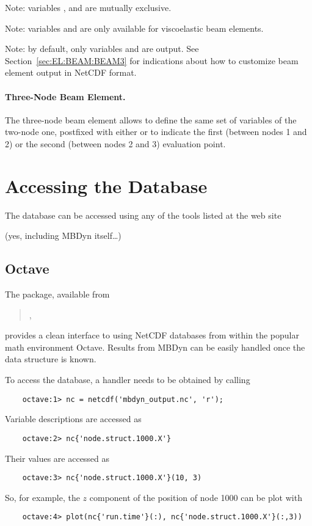 Note: variables ,  
and  are mutually exclusive.

Note: variables  and 
are only available for viscoelastic beam elements.

Note: by default, only variables 
and  are output.
See Section~\ref{sec:EL:BEAM:BEAM3} for indications
about how to customize beam element output in NetCDF format.

\paragraph{Three-Node Beam Element.}
The three-node beam element allows to define the same set of variables
of the two-node one, postfixed with either  or 
to indicate the first (between nodes 1 and 2)
or the second (between nodes 2 and 3)
evaluation point.






\section{Accessing the Database}
The database can be accessed using any of the tools listed at the web site
\begin{quote}
\end{quote}
(yes, including MBDyn itself\ldots)



\subsection{Octave}
The  package, available from
\begin{quote}
,
\end{quote}
provides a clean interface to using NetCDF databases from within
the popular math environment Octave.
Results from MBDyn can be easily handled once the data structure is known.

To access the database, a handler needs to be obtained by calling
\begin{verbatim}
    octave:1> nc = netcdf('mbdyn_output.nc', 'r');
\end{verbatim}
Variable descriptions are accessed as
\begin{verbatim}
    octave:2> nc{'node.struct.1000.X'}
\end{verbatim}
Their values are accessed as
\begin{verbatim}
    octave:3> nc{'node.struct.1000.X'}(10, 3)
\end{verbatim}
So, for example, the $z$ component of the position of node 1000 can be plot with 
\begin{verbatim}
    octave:4> plot(nc{'run.time'}(:), nc{'node.struct.1000.X'}(:,3))
\end{verbatim}

